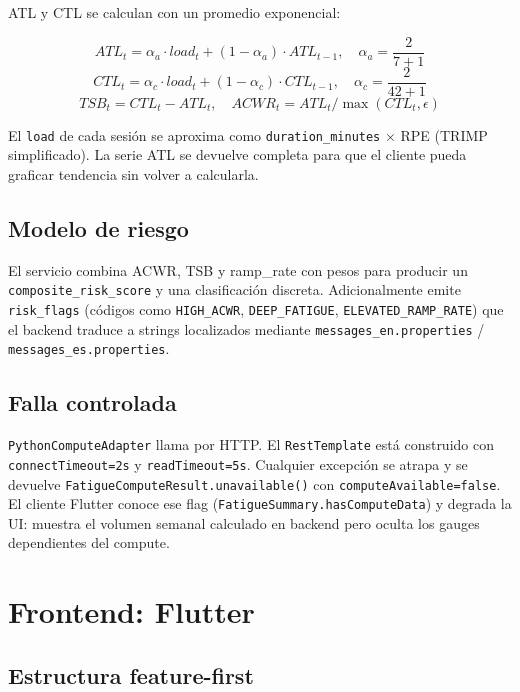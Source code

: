 \documentclass[11pt,a4paper]{article}
\newcommand{\cls}[1]{\texttt{\small #1}}
\begin{document}
ATL y CTL se calculan con un promedio exponencial:

\[
ATL_t = \alpha_a \cdot load_t + (1 - \alpha_a) \cdot ATL_{t-1}, \quad \alpha_a = \frac{2}{7+1}
\]
\[
CTL_t = \alpha_c \cdot load_t + (1 - \alpha_c) \cdot CTL_{t-1}, \quad \alpha_c = \frac{2}{42+1}
\]
\[
TSB_t = CTL_t - ATL_t, \quad ACWR_t = ATL_t / \max(CTL_t, \epsilon)
\]

El \texttt{load} de cada sesión se aproxima como \texttt{duration\_minutes} $\times$ RPE (TRIMP simplificado). La serie ATL se devuelve completa para que el cliente pueda graficar tendencia sin volver a calcularla.

\subsection{Modelo de riesgo}

El servicio combina ACWR, TSB y ramp\_rate con pesos para producir un \texttt{composite\_risk\_score} y una clasificación discreta. Adicionalmente emite \texttt{risk\_flags} (códigos como \texttt{HIGH\_ACWR}, \texttt{DEEP\_FATIGUE}, \texttt{ELEVATED\_RAMP\_RATE}) que el backend traduce a strings localizados mediante \texttt{messages\_en.properties} / \texttt{messages\_es.properties}.

\subsection{Falla controlada}

\cls{PythonComputeAdapter} llama por HTTP. El \texttt{RestTemplate} está construido con \texttt{connectTimeout=2s} y \texttt{readTimeout=5s}. Cualquier excepción se atrapa y se devuelve \cls{FatigueComputeResult.unavailable()} con \texttt{computeAvailable=false}. El cliente Flutter conoce ese flag (\cls{FatigueSummary.hasComputeData}) y degrada la UI: muestra el volumen semanal calculado en backend pero oculta los gauges dependientes del compute.

\section{Frontend: Flutter}

\subsection{Estructura feature-first}
\end{document}
